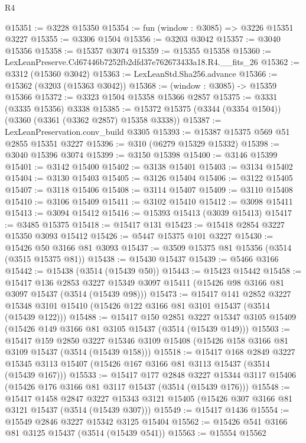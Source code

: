 \begin{lexlean}{R4}
\begin{coremodule}
@15351 := @3228 @15350
@15354 := fun (window : @3085) => @3226 @15351 @3227
@15355 := @3306 @1504
@15356 := @3203 @3042
@15357 := @3040 @15356
@15358 := @15357 @3074
@15359 := @15355 @15358
@15360 := LexLeanPreserve.Cd67446b7252fb2dfd37e762673433a18.R4.__fits_26
@15362 := @3312 (@15360 @3042)
@15363 := LexLeanStd.Sha256.advance
@15366 := @15362 (@3203 (@15363 @3042))
@15368 := (window : @3085) -> @15359 @15366
@15372 := @3323 @1504 @15358 @15366 @2857
@15375 := @3331 (@3335 @15356) @3338
@15385 := @15372 @15375 (@3344 (@3354 @1504)) (@3360 (@3361 (@3362 @2857) @15358 @3338))
@15387 := LexLeanPreservation.conv_build @3305
@15393 := @15387 @15375 @569 @51 @2855 @15351 @3227
@15396 := @310 (@6279 @15329 @15332)
@15398 := @3040 @15396 @3074
@15399 := @3150 @15398
@15400 := @3146 @15399
@15401 := @3142 @15400
@15402 := @3138 @15401
@15403 := @3134 @15402
@15404 := @3130 @15403
@15405 := @3126 @15404
@15406 := @3122 @15405
@15407 := @3118 @15406
@15408 := @3114 @15407
@15409 := @3110 @15408
@15410 := @3106 @15409
@15411 := @3102 @15410
@15412 := @3098 @15411
@15413 := @3094 @15412
@15416 := @15393 @15413 (@3039 @15413)
@15417 := @3485 @15375
@15418 := @15417 @131
@15423 := @15418 @2854 @3227 @15350 @3093 @15412
@15426 := @5447 @15375 @101 @3227
@15430 := @15426 @50 @3166 @81 @3093
@15437 := @3509 @15375 @81 @15356 (@3514 (@3515 @15375 @81))
@15438 := @15430 @15437
@15439 := @5466 @3166
@15442 := @15438 (@3514 (@15439 @50))
@15443 := @15423 @15442
@15458 := @15417
    @136
    @2853
    @3227
    @15349
    @3097
    @15411
    (@15426 @98 @3166 @81 @3097 @15437 (@3514 (@15439 @98)))
@15473 := @15417
    @141
    @2852
    @3227
    @15348
    @3101
    @15410
    (@15426 @122 @3166 @81 @3101 @15437 (@3514 (@15439 @122)))
@15488 := @15417
    @150
    @2851
    @3227
    @15347
    @3105
    @15409
    (@15426 @149 @3166 @81 @3105 @15437 (@3514 (@15439 @149)))
@15503 := @15417
    @159
    @2850
    @3227
    @15346
    @3109
    @15408
    (@15426 @158 @3166 @81 @3109 @15437 (@3514 (@15439 @158)))
@15518 := @15417
    @168
    @2849
    @3227
    @15345
    @3113
    @15407
    (@15426 @167 @3166 @81 @3113 @15437 (@3514 (@15439 @167)))
@15533 := @15417
    @177
    @2848
    @3227
    @15344
    @3117
    @15406
    (@15426 @176 @3166 @81 @3117 @15437 (@3514 (@15439 @176)))
@15548 := @15417
    @1458
    @2847
    @3227
    @15343
    @3121
    @15405
    (@15426 @307 @3166 @81 @3121 @15437 (@3514 (@15439 @307)))
@15549 := @15417 @1436
@15554 := @15549 @2846 @3227 @15342 @3125 @15404
@15562 := @15426 @541 @3166 @81 @3125 @15437 (@3514 (@15439 @541))
@15563 := @15554 @15562

\end{coremodule}
\end{lexlean}
